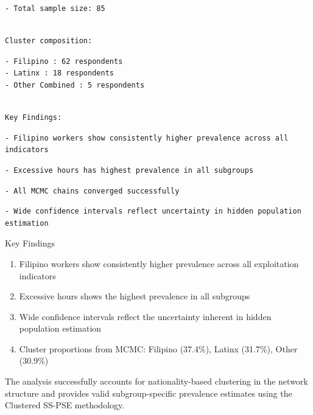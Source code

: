 \documentclass[
  12pt,
  letterpaper,
  DIV=11,
  numbers=noendperiod]{scrartcl}
\providecommand{\tightlist}{%
  \setlength{\itemsep}{0pt}\setlength{\parskip}{0pt}}
\theoremstyle{plain}
\theoremstyle{definition}
\begin{document}
\begin{verbatim}
- Total sample size: 85 
\end{verbatim}

\begin{verbatim}

Cluster composition:
\end{verbatim}

\begin{verbatim}
- Filipino : 62 respondents
- Latinx : 18 respondents
- Other Combined : 5 respondents
\end{verbatim}

\begin{verbatim}

Key Findings:
\end{verbatim}

\begin{verbatim}
- Filipino workers show consistently higher prevalence across all 
indicators
\end{verbatim}

\begin{verbatim}
- Excessive hours has highest prevalence in all subgroups
\end{verbatim}

\begin{verbatim}
- All MCMC chains converged successfully
\end{verbatim}

\begin{verbatim}
- Wide confidence intervals reflect uncertainty in hidden population 
estimation
\end{verbatim}

Key Findings

\begin{enumerate}
\def\labelenumi{\arabic{enumi}.}
\tightlist
\item
  Filipino workers show consistently higher prevalence across all
  exploitation indicators
\item
  Excessive hours shows the highest prevalence in all subgroups
\item
  Wide confidence intervals reflect the uncertainty inherent in hidden
  population estimation
\item
  Cluster proportions from MCMC: Filipino (37.4\%), Latinx (31.7\%),
  Other (30.9\%)
\end{enumerate}

The analysis successfully accounts for nationality-based clustering in
the network structure and provides valid subgroup-specific prevalence
estimates using the Clustered SS-PSE methodology.
\end{document}
